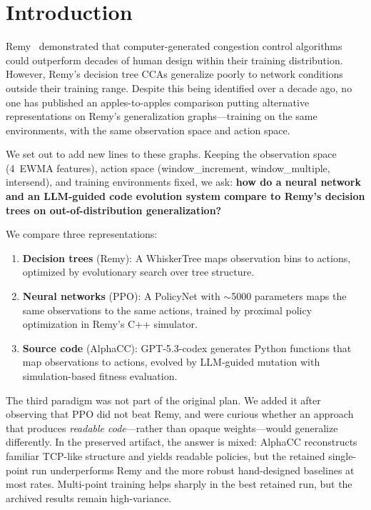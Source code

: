 \section{Introduction}

Remy~\cite{winstein2013tcp} demonstrated that computer-generated congestion
control algorithms could outperform decades of human design within their
training distribution. However, Remy's decision tree CCAs generalize poorly
to network conditions outside their training range. Despite this being
identified over a decade ago, no one has published an apples-to-apples
comparison putting alternative representations on Remy's generalization
graphs---training on the same environments, with the same observation space
and action space.

We set out to add new lines to these graphs. Keeping the observation space
(4~EWMA features), action space (window\_increment, window\_multiple,
intersend), and training environments fixed, we ask: \textbf{how do a neural
network and an LLM-guided code evolution system compare to Remy's decision
trees on out-of-distribution generalization?}

We compare three representations:

\begin{enumerate}
\item \textbf{Decision trees} (Remy): A WhiskerTree maps observation bins to
  actions, optimized by evolutionary search over tree structure.
\item \textbf{Neural networks} (PPO): A PolicyNet with ${\sim}$5000
  parameters maps the same observations to the same actions, trained by
  proximal policy optimization in Remy's C++ simulator.
\item \textbf{Source code} (AlphaCC): GPT-5.3-codex generates Python
  functions that map observations to actions, evolved by LLM-guided mutation
  with simulation-based fitness evaluation.
\end{enumerate}

The third paradigm was not part of the original plan. We added it after
observing that PPO did not beat Remy, and were curious whether an approach
that produces \emph{readable code}---rather than opaque weights---would
generalize differently. In the preserved artifact, the answer is mixed:
AlphaCC reconstructs familiar TCP-like structure and yields readable policies,
but the retained single-point run underperforms Remy and the more robust
hand-designed baselines at most rates. Multi-point training helps sharply in
the best retained run, but the archived results remain high-variance.

